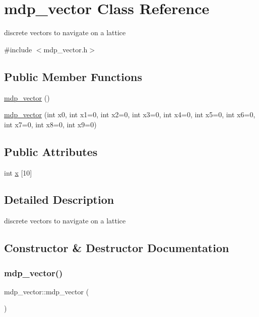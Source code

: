 \hypertarget{classmdp__vector}{}\section{mdp\+\_\+vector Class Reference}
\label{classmdp__vector}


discrete vectors to navigate on a lattice  




{\ttfamily \#include $<$mdp\+\_\+vector.\+h$>$}

\subsection*{Public Member Functions}
\begin{DoxyCompactItemize}
\item 
\hyperlink{classmdp__vector_a5be7b2dcf1da5df366175d5d02116cf4}{mdp\+\_\+vector} ()
\item 
\hyperlink{classmdp__vector_a2329077b47bdadc32142aa6c2788ad6f}{mdp\+\_\+vector} (int x0, int x1=0, int x2=0, int x3=0, int x4=0, int x5=0, int x6=0, int x7=0, int x8=0, int x9=0)
\end{DoxyCompactItemize}
\subsection*{Public Attributes}
\begin{DoxyCompactItemize}
\item 
int \hyperlink{classmdp__vector_ae8332afc86ad8644e393657da2f109e4}{x} \mbox{[}10\mbox{]}
\end{DoxyCompactItemize}


\subsection{Detailed Description}
discrete vectors to navigate on a lattice 

\subsection{Constructor \& Destructor Documentation}
\mbox{\label{classmdp__vector_a5be7b2dcf1da5df366175d5d02116cf4}} 
\subsubsection{\texorpdfstring{mdp\+\_\+vector()}{mdp\_vector()}\hspace{0.1cm}{\footnotesize\ttfamily [1/2]}}
{\footnotesize\ttfamily mdp\+\_\+vector\+::mdp\+\_\+vector (\begin{DoxyParamCaption}{ }\end{DoxyParamCaption})\hspace{0.3cm}{\ttfamily [inline]}}

